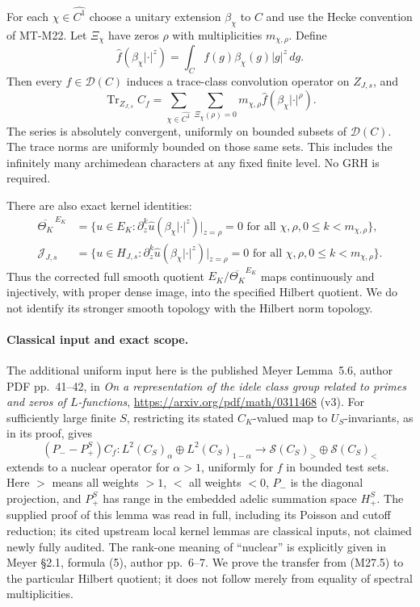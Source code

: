 For each $\chi\in\widehat{C^1}$ choose a unitary extension
$\beta_\chi$ to $C$ and use the Hecke convention of MT-M22.
Let $\Xi_\chi$ have zeros $\rho$ with multiplicities
$m_{\chi,\rho}$. Define
\[
 \widehat f(\beta_\chi|\cdot|^z)
       =\int_C f(g)\beta_\chi(g)|g|^z\,dg.
                                                               \tag{M27.2}
\]
Then every $f\in\mathcal D(C)$ induces a trace-class
convolution operator on $Z_{J,s}$, and
\[
 \operatorname{Tr}_{Z_{J,s}}C_f
     =\sum_{\chi\in\widehat{C^1}}
        \sum_{\Xi_\chi(\rho)=0}
                   m_{\chi,\rho}
                     \widehat f(\beta_\chi|\cdot|^\rho).
                                                               \tag{M27.3}
\]
The series is absolutely convergent, uniformly on bounded
subsets of $\mathcal D(C)$. The trace norms are uniformly
bounded on those same sets. This includes the infinitely
many archimedean characters at any fixed finite level.
No GRH is required.

There are also exact kernel identities:
\[
 \begin{split}
 \overline{\Theta_K}^{\,E_K}
   &=\{u\in E_K:
      \partial_z^k\widehat u(\beta_\chi|\cdot|^z)|_{z=\rho}=0
            \text{ for all }\chi,\rho,0\le k<m_{\chi,\rho}\},\\
 \mathcal J_{J,s}
   &=\{u\in H_{J,s}:
      \partial_z^k\widehat u(\beta_\chi|\cdot|^z)|_{z=\rho}=0
            \text{ for all }\chi,\rho,0\le k<m_{\chi,\rho}\}.
 \end{split}                                                    \tag{M27.4}
\]
Thus the corrected full smooth quotient
$E_K/\overline{\Theta_K}^{E_K}$ maps continuously and
injectively, with proper dense image, into the specified
Hilbert quotient. We do not identify its stronger smooth
topology with the Hilbert norm topology.

\paragraph{Classical input and exact scope.}
The additional uniform input here is the published Meyer
Lemma~5.6, author PDF pp.~41--42, in
\emph{On a representation of the idele class group related
to primes and zeros of $L$-functions},
\url{https://arxiv.org/pdf/math/0311468} (v3).
For sufficiently large finite $S$, restricting its
stated $C_K$-valued map to $U_S$-invariants, as in
its proof, gives
\[
 (P_--P_+^S)C_f:
      L^2(C_S)_\alpha\oplus L^2(C_S)_{1-\alpha}
           \longrightarrow
          \mathcal S(C_S)_{>}\oplus\mathcal S(C_S)_{<}
                                                               \tag{M27.5}
\]
extends to a nuclear operator for $\alpha>1$,
uniformly for $f$ in bounded test sets.
Here $>$ means all weights $>1$, $<$ all weights $<0$,
$P_-$ is the diagonal projection, and $P_+^S$ has range
in the embedded adelic summation space $H_+^S$.
The supplied proof of this lemma was read in full,
including its Poisson and cutoff reduction; its cited
upstream local kernel lemmas are classical inputs, not
claimed newly fully audited. The rank-one meaning of
``nuclear'' is explicitly given in Meyer \S2.1, formula
(5), author pp.~6--7. We prove the transfer from (M27.5)
to the particular Hilbert quotient; it does not follow
merely from equality of spectral multiplicities.

